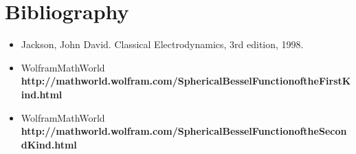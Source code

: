 \documentclass[a4paper,12pt]{article}
\begin{document}
\section{Bibliography}

\begin{itemize}

\item Jackson, John David. Classical Electrodynamics, 3rd edition, 1998.
\tiny
\item WolframMathWorld \textbf{http://mathworld.wolfram.com/SphericalBesselFunctionoftheFirstKind.html}
\item WolframMathWorld \textbf{http://mathworld.wolfram.com/SphericalBesselFunctionoftheSecondKind.html}
\end{itemize}
\end{document}
